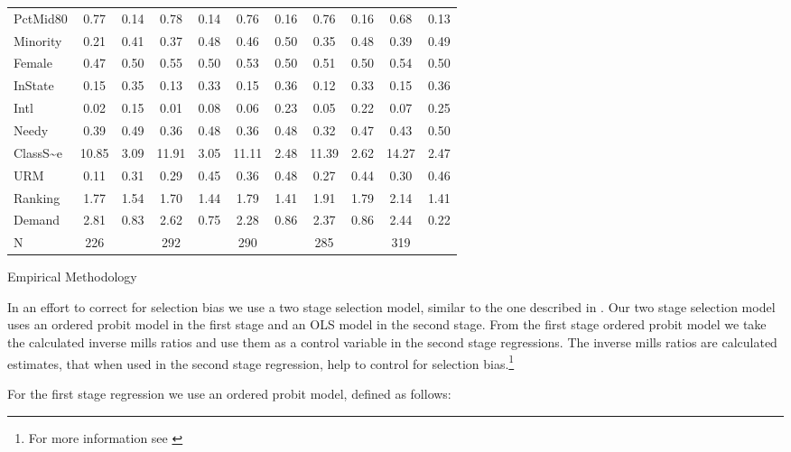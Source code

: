 \documentclass[12pt,a4paper,english,fleqn]{article}
\makeatletter
\renewcommand\section{\@startsection{section}{1}{\z@}
{-5ex \@plus -1ex \@minus -.2ex}{2.3ex \@plus.2ex}{\normalfont\large\bf}}
\makeatother
\begin{document}
\begin{sidewaystable}
\begin{tabular}{|l|c|c|c|c|c|c|c|c|c|c|}
            PctMid80 & 0.77  & 0.14 & 0.78  & 0.14 & 0.76  & 0.16 & 0.76  & 0.16 & 0.68  & 0.13 \\
            Minority & 0.21  & 0.41 & 0.37  & 0.48 & 0.46  & 0.50 & 0.35  & 0.48 & 0.39  & 0.49 \\
            Female   & 0.47  & 0.50 & 0.55  & 0.50 & 0.53  & 0.50 & 0.51  & 0.50 & 0.54  & 0.50 \\
            InState  & 0.15  & 0.35 & 0.13  & 0.33 & 0.15  & 0.36 & 0.12  & 0.33 & 0.15  & 0.36 \\
            Intl     & 0.02  & 0.15 & 0.01  & 0.08 & 0.06  & 0.23 & 0.05  & 0.22 & 0.07  & 0.25 \\
            Needy    & 0.39  & 0.49 & 0.36  & 0.48 & 0.36  & 0.48 & 0.32  & 0.47 & 0.43  & 0.50 \\
            ClassS{\textasciitilde}e & 10.85 & 3.09 & 11.91 & 3.05 & 11.11 & 2.48 & 11.39 & 2.62 & 14.27 & 2.47 \\
            URM      & 0.11  & 0.31 & 0.29  & 0.45 & 0.36  & 0.48 & 0.27  & 0.44 & 0.30  & 0.46 \\
            Ranking  & 1.77  & 1.54 & 1.70  & 1.44 & 1.79  & 1.41 & 1.91  & 1.79 & 2.14  & 1.41 \\
            Demand   & 2.81  & 0.83 & 2.62  & 0.75 & 2.28  & 0.86 & 2.37  & 0.86 & 2.44  & 0.22 \\
\hline
N & 226 & & 292 & & 290 & & 285 & & 319\\
\hline
\hline
\end{tabular}
\end{sidewaystable}
\newpage{}
\section{Empirical Methodology}\label{methods}

In an effort to correct for selection bias we use a two stage selection model, similar to the one described in \citet{heckman1979sample}. Our two stage selection model uses an ordered probit model in the first stage and an OLS model in the second stage. From the first stage ordered probit model we take the calculated inverse mills ratios and use them as a control variable in the second stage regressions. The inverse mills ratios are calculated estimates, that when used in the second stage regression, help to control for selection bias.\footnote{For more information see \citet{greene2002limdep}}

For the first stage regression we use an ordered probit model, defined as follows:
\end{document}
